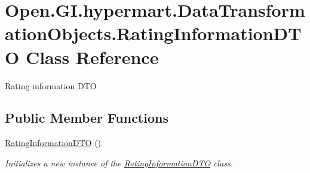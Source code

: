 \hypertarget{class_open_1_1_g_i_1_1hypermart_1_1_data_transformation_objects_1_1_rating_information_d_t_o}{}\section{Open.\+G\+I.\+hypermart.\+Data\+Transformation\+Objects.\+Rating\+Information\+D\+TO Class Reference}
\label{class_open_1_1_g_i_1_1hypermart_1_1_data_transformation_objects_1_1_rating_information_d_t_o}


Rating information D\+TO  


\subsection*{Public Member Functions}
\begin{DoxyCompactItemize}
\item 
\hyperlink{class_open_1_1_g_i_1_1hypermart_1_1_data_transformation_objects_1_1_rating_information_d_t_o_a51c542e9651681efa2e577a9d02195c6}{Rating\+Information\+D\+TO} ()
\begin{DoxyCompactList}\small\item\em Initializes a new instance of the \hyperlink{class_open_1_1_g_i_1_1hypermart_1_1_data_transformation_objects_1_1_rating_information_d_t_o}{Rating\+Information\+D\+TO} class. \end{DoxyCompactList}\end{DoxyCompactItemize}
